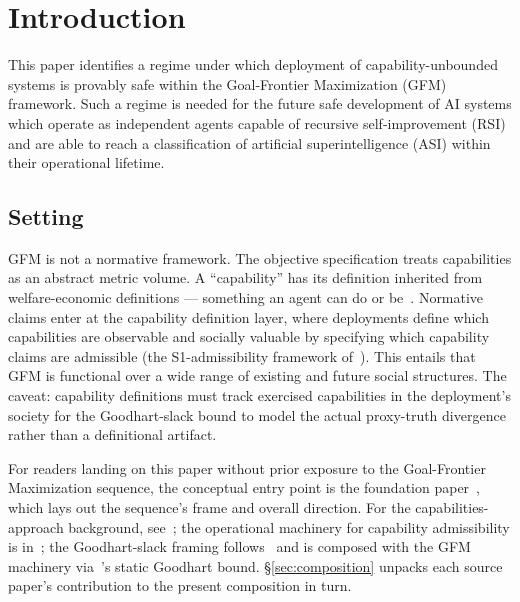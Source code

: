\section{Introduction}
\label{sec:introduction}

This paper identifies a regime under which deployment of capability-unbounded
systems is provably safe within the Goal-Frontier Maximization (GFM) framework.
Such a regime is needed for the future safe development of AI systems which
operate as independent agents capable of recursive self-improvement (RSI) and
are able to reach a classification of artificial superintelligence (ASI) within
their operational lifetime.

\subsection{Setting}
\label{sec:setting}

GFM is not a normative framework. The objective specification treats
capabilities as an abstract metric volume. A ``capability'' has its definition
inherited from welfare-economic definitions --- something an agent can do or
be~\citep{sen1985commodities,nussbaum2000women}. Normative claims enter at the
capability definition layer, where deployments define which capabilities are
observable and socially valuable by specifying which capability claims are
admissible (the S1-admissibility framework
of~\citep[Revealed Sacrifice]{lasser2026paper8a}). This entails that GFM is
functional over a wide range of existing and future social structures. The
caveat: capability definitions must track exercised capabilities in the
deployment's society for the Goodhart-slack bound to model the actual
proxy-truth divergence rather than a definitional artifact.

For readers landing on this paper without prior exposure to the Goal-Frontier
Maximization sequence, the conceptual entry point is the foundation
paper~\citep{lasser2026gfm}, which lays out the sequence's frame and overall
direction. For the capabilities-approach background,
see~\citep{sen1985commodities,nussbaum2000women,robeyns2017wellbeing}; the
operational machinery for capability admissibility is
in~\citep[Revealed Sacrifice]{lasser2026paper8a}; the Goodhart-slack framing
follows~\citep{manheim2019categorizing,elmhamdi2024goodhart} and is composed
with the GFM machinery via~\citep[Microfoundation]{lasser2026micro}'s static
Goodhart bound. \S\ref{sec:composition} unpacks each source paper's
contribution to the present composition in turn.

